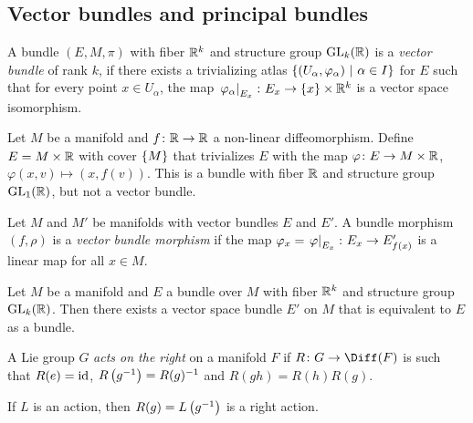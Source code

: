 \newpage

\subsection{Vector bundles and principal bundles}

\begin{definicija}
A bundle $(E, M, \pi)$ with fiber $\mathbb{R}^k$ and structure group
$\operatorname{GL}_k(\mathbb{R})$ is a \emph{vector bundle} of rank
$k$, if there exists a trivializing atlas
$\left\{(U_\alpha, \varphi_\alpha)~\middle\vert~\alpha \in I\right\}$ for $E$ such that
for every point $x \in U_\alpha$, the map
$\left. \varphi_\alpha\right|_{E_x}^{} \colon E_x \to \left\{x\right\} \times \mathbb{R}^k$
is a vector space isomorphism.
\end{definicija}

\begin{opomba}
Let $M$ be a manifold and $f \colon \mathbb{R} \to \mathbb{R}$ a non-linear
diffeomorphism. Define $E = M \times \mathbb{R}$ with cover $\left\{M\right\}$ that
trivializes $E$ with the map $\varphi \colon E \to M \times \mathbb{R}$,
$\varphi(x,v) \mapsto (x, f(v))$. This is a bundle with fiber $\mathbb{R}$
and structure group $\operatorname{GL}_1(\mathbb{R})$, but not a vector bundle.
\end{opomba}

\begin{definicija}
Let $M$ and $M'$ be manifolds with vector bundles $E$ and $E'$. A
bundle morphism $(f, \rho)$ is a
\emph{vector bundle morphism} if the
map $\varphi_x = \left. \varphi\right|_{E_x}^{} \colon E_x \to E_{f(x)}'$ is
a linear map for all $x \in M$.
\end{definicija}

\begin{lema}
Let $M$ be a manifold and $E$ a bundle over $M$ with fiber $\mathbb{R}^k$
and structure group $\operatorname{GL}_k(\mathbb{R})$. Then there exists a vector space
bundle $E'$ on $M$ that is equivalent to $E$ as a bundle.
\end{lema}

\begin{definicija}
A Lie group $G$ \emph{acts on the right} on a
manifold $F$ if $R \colon G \to \Diff(F)$ is such that
$R(e) = \operatorname{id}$, $R \left(g^{-1}\right) = R(g)^{-1}$ and
$R(gh) = R(h) R(g)$.
\end{definicija}

\begin{opomba}
If $L$ is an action, then $R(g) = L \left(g^{-1}\right)$ is a right action.
\end{opomba}

